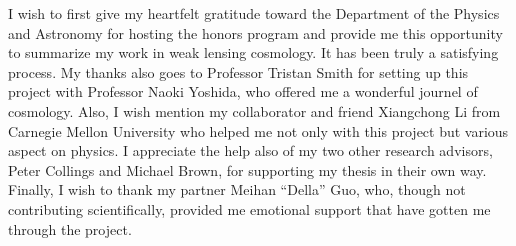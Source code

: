 I wish to first give my heartfelt gratitude toward the Department of the Physics and Astronomy for hosting the honors program and provide me this opportunity to summarize my work in weak lensing cosmology. It has been truly a satisfying process.
My thanks also goes to Professor Tristan Smith for setting up this project with Professor Naoki Yoshida, who offered me a wonderful journel of cosmology. 
Also, I wish mention my collaborator and friend Xiangchong Li from Carnegie Mellon University who helped me not only with this project but various aspect on physics. 
I appreciate the help also of my two other research advisors, Peter Collings and Michael Brown, for supporting my thesis in their own way. 
Finally, I wish to thank my partner Meihan ``Della'' Guo, who, though not contributing scientifically, provided me emotional support that have gotten me through the project. 
